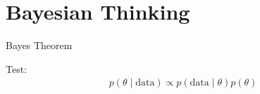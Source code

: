 \section{Bayesian Thinking}

\begin{frame}{Bayes Theorem}

Test:
\begin{align*}
 p(\theta \mid \text{data}) \propto p(\text{data} \mid \theta) p(\theta)
\end{align*}

\end{frame}
